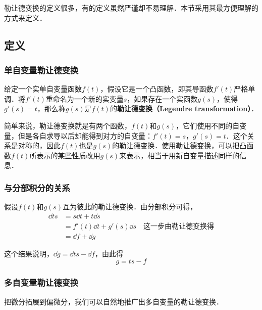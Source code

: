 

勒让德变换的定义很多，有的定义虽然严谨却不易理解．本节采用其最方便理解的方式来定义．

\subsection{定义}

\subsubsection{单自变量勒让德变换}
\begin{definition}{}
给定一个实单自变量函数$f(t)$，假设它是一个凸函数，即其导函数$f'(t)$严格单调．将$f'(t)$重命名为一个新的实变量$s$，如果存在一个实函数$g(s)$，使得$g'(s)=t$，那么称$g(s)$是$f(t)$的\textbf{勒让德变换（Legendre transformation）}．
\end{definition}

简单来说，勒让德变换就是有两个函数，$f(t)$和$g(s)$，它们使用不同的自变量，但是各自求导以后却能得到对方的自变量：$f'(t)=s$，$g'(s)=t$．这个关系是对称的，因此$f(t)$也是$g(s)$的勒让德变换．使用勒让德变换，可以把凸函数$f(t)$所表示的某些性质改用$g(s)$来表示，相当于用新自变量描述同样的信息．

\subsubsection{与分部积分的关系}

假设$f(t)$和$g(s)$互为彼此的勒让德变换．由分部积分可得，
\begin{equation}
\begin{aligned}
\dd{ts}&=s\dd{t}+t\dd{s}\\&=f'(t)\dd{t}+g'(s)\dd{s}\quad\text{这一步由勒让德变换得}\\&=\dd{f}+\dd{g}
\end{aligned}
\end{equation}

这个结果说明，$\dd{g}=\dd{ts}-\dd{f}$，由此得
\begin{equation}
g=ts-f
\end{equation}


\subsubsection{多自变量勒让德变换}

把微分拓展到偏微分，我们可以自然地推广出多自变量的勒让德变换．

